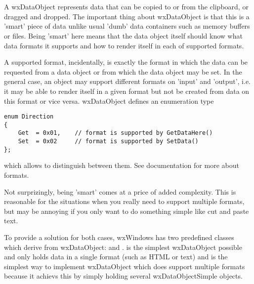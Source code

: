 
\section{}\label{wxdataobject}

A wxDataObject represents data that can be copied to or from the clipboard, or
dragged and dropped. The important thing about wxDataObject is that this is a
'smart' piece of data unlike usual 'dumb' data containers such as memory
buffers or files. Being 'smart' here means that the data object itself should
know what data formats it supports and how to render itself in each of
supported formats.

A supported format, incidentally, is exactly the format in which the data can
be requested from a data object or from which the data object may be set. In
the general case, an object may support different formats on 'input' and
'output', i.e. it may be able to render itself in a given format but not be
created from data on this format or vice versa. wxDataObject defines an
enumeration type

\begin{verbatim}
enum Direction
{
    Get  = 0x01,    // format is supported by GetDataHere()
    Set  = 0x02     // format is supported by SetData()
};
\end{verbatim}

which allows to distinguish between them. See 
 documentation for more about formats.

Not surprizingly, being 'smart' comes at a price of added complexity. This is
reasonable for the situations when you really need to support multiple formats,
but may be annoying if you only want to do something simple like cut and paste
text.

To provide a solution for both cases, wxWindows has two predefined classes
which derive from wxDataObject:  and 
. 
 is
the simplest wxDataObject possible and only holds data in a single format (such
as HTML or text) and  is
the simplest way to implement wxDataObject which does support multiple formats
because it achievs this by simply holding several wxDataObjectSimple objects.

